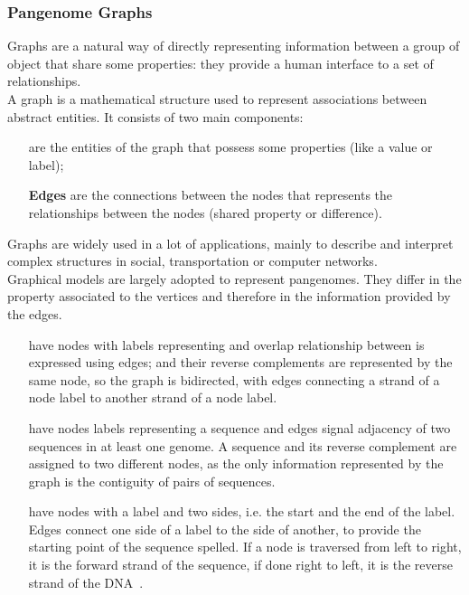 \subsubsection{Pangenome Graphs}
Graphs are a natural way of directly representing information between a group of object that share some properties: they provide a human interface to a set of relationships. \\
A graph is a mathematical structure used to represent associations between abstract entities. It consists of two main components:
\begin{itemize}[leftmargin=1.8cm]
	\item[\smash{\stackunder{\textbf{Nodes}}{\textbf{(vertices)}}}] are the entities of the graph that possess some properties (like a value or label);
	\item[\textbf{Edges}] are the connections between the nodes that represents the relationships between the nodes (shared property or difference).
\end{itemize}
Graphs are widely used in a lot of applications, mainly to describe and interpret complex structures in social, transportation or computer networks.\\
Graphical models are largely adopted to represent pangenomes. They differ in the property associated to the vertices and therefore in the information provided by the edges.
\begin{itemize}[leftmargin=1.8cm]
	\item[{\smash{\stackunder{\textbf{De Bruijn}}{\textbf{graphs}}}}] have nodes with labels representing \kmers and overlap relationship between \kmers is expressed using edges; \kmers and their reverse complements are represented by the same node, so the graph is bidirected, with edges connecting a strand of a node label to another strand of a node label.
	\item[{\smash{\stackunder{\textbf{Directed genome}}{\textbf{graphs}}}}] have nodes labels representing a sequence and edges signal adjacency of two sequences in at least one genome. A sequence and its reverse complement are assigned to two different nodes, as the only information represented by the graph is the contiguity of pairs of sequences.
	\item[{\smash{\stackunder{\textbf{Bidirected genome}}{\textbf{graphs}}}}] have nodes with a label and two sides, i.e. the start and the end of the label. Edges connect one side of a label to the side of another, to provide the starting point of the sequence spelled. If a node is traversed from left to right, it is the forward strand of the sequence, if done right to left, it is the reverse strand of the DNA~\cite{odgi}.
\end{itemize}
